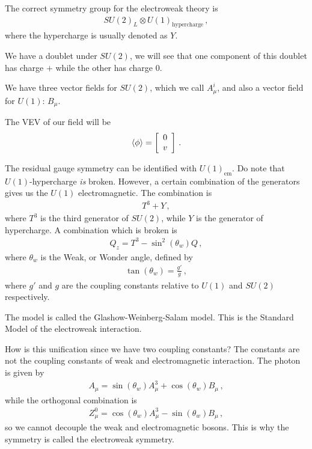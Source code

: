 \documentclass[main.tex]{subfiles}
\begin{document}
The correct symmetry group for the electroweak theory is 
%
\begin{align}
SU(2)_{L} \otimes U(1) _{\text{hypercharge}}
\,,
\end{align}
%
where the hypercharge is usually denoted as \(Y\).

We have a doublet under \(SU(2)\), we will see that one component of this doublet has charge \(+\) while the other has charge 0.

We have three vector fields for \(SU(2)\), which we call \(A_{\mu}^{i}\), and also a vector field for \(U(1)\): \(B_{\mu }\).

The VEV of our field will be 
%
\begin{subequations}
\begin{align}
\expval{\phi }= \left[\begin{array}{c}
0 \\ 
v
\end{array}\right]
\,.
\end{align}
\end{subequations}

The residual gauge symmetry can be identified with \(U(1)_{\text{em}}\). Do note that \(U(1)\)-hypercharge \emph{is} broken. However, a certain combination of the generators gives us the \(U(1)\) electromagnetic.
The combination is 
%
\begin{align}
T^{3} + Y
\,,
\end{align}
%
where \(T^{3}\) is the third generator of \(SU(2)\), while \(Y\) is the generator of hypercharge. 
A combination which is broken is 
%
\begin{align}
Q_{z} = T^{3} - \sin^2 (\theta_{w}) Q
\,,
\end{align}
%
where \(\theta_{w}\) is the Weak, or Wonder angle, defined by 
%
\begin{align}
\tan(\theta_{w}) = \frac{g'}{g}
\,,
\end{align}
%
where \(g'\) and \(g\) are the coupling constants relative to \(U(1)\) and \(SU(2)\) respectively.

The model is called the Glashow-Weinberg-Salam model. This is the Standard Model of the electroweak interaction.

How is this unification since we have two coupling constants? The constants are not the coupling constants of weak and electromagnetic interaction. The photon is given by
%
\begin{align}
A_{\mu } = \sin(\theta_{w}) A^{3}_{\mu } + \cos(\theta_{w}) B_{\mu }
\,,
\end{align}
%
while the orthogonal combination is 
%
\begin{align}
Z^{0}_{\mu } = \cos(\theta_{w}) A^{3}_{\mu } - \sin(\theta_{w}) B_{\mu }
\,,
\end{align}
%
so we cannot decouple the weak and electromagnetic bosons.
This is why the symmetry is called the electroweak symmetry.
\end{document}
